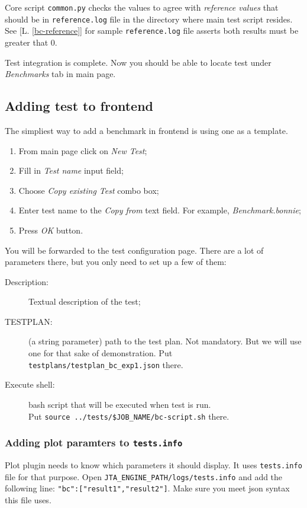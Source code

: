 Core script \texttt{common.py} checks the values to agree with \textit{reference values} that should be in \texttt{reference.log} file in the directory where main test script resides. See [L. \ref{bc-reference}] for sample \texttt{reference.log} file asserts both results must be greater that 0. 

Test integration is complete. Now you should be able to locate test under \textit{Benchmarks} tab in main page.

\subsection{Adding test to frontend}
\label{sec:test-add-frontend}

The simpliest way to add a benchmark in frontend is using one as a template.
\begin{enumerate}
\item From main page click on \textit{New Test};
\item Fill in \textit{Test name} input field;
\item Choose \textit{Copy existing Test} combo box;
\item Enter test name to the \textit{Copy from} text field. For example, \textit{Benchmark.bonnie};
\item Press \textit{OK} button.
\end{enumerate}

You will be forwarded to the test configuration page. There are a lot of parameters there, but you only need to set up a few of them:

\begin{description}
\item[Description:] Textual description of the test;
\item[TESTPLAN:] (a string parameter) path to the test plan. Not mandatory. But we will use one for that sake of demonstration.
  Put \texttt{testplans/testplan\_bc\_exp1.json} there.
\item[Execute shell:] bash script that will be executed when test is run. \\
  Put \texttt{source ../tests/\$JOB\_NAME/bc-script.sh} there.
\end{description}


\subsubsection{Adding plot paramters to \texttt{tests.info}}
\label{sec:edit-tst-info}
Plot plugin needs to know which parameters it should display. It uses \texttt{tests.info}
file for that purpose.
Open \texttt{JTA\_ENGINE\_PATH/logs/tests.info} and add the following line:
\texttt{"bc":["result1","result2"]}. Make sure you meet json syntax this file uses.

